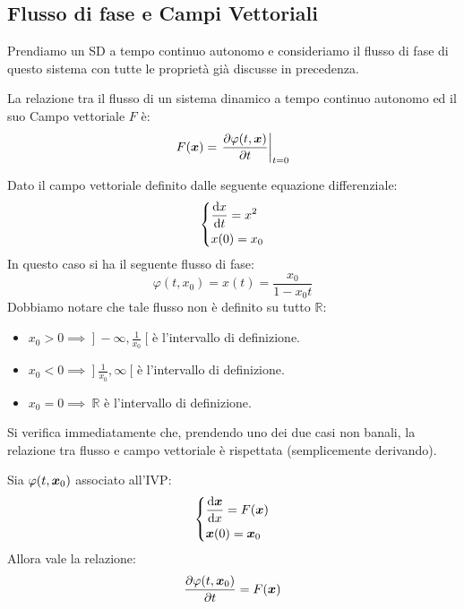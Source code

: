 \subsection{Flusso di fase e Campi Vettoriali}%
\label{sub:Flusso di fase e Campi Vettoriali}
Prendiamo un SD a tempo continuo autonomo e consideriamo il flusso di fase di questo sistema con tutte le proprietà già discusse in precedenza. \\
\begin{thm}
    La relazione tra il flusso di un sistema dinamico a tempo continuo autonomo ed il suo Campo vettoriale $F$ è:
    \[
	F(\boldsymbol{x})=\left.\frac{\partial \varphi (t, \boldsymbol{x})}{\partial t} \right|_{t=0}
    \] 
\end{thm}
\noindent
\begin{exmp}
    Dato il campo vettoriale definito dalle seguente equazione differenziale:
    \[\begin{dcases}
	\frac{\text{d} x}{\text{d} t} = x^2 \\
	x(0)=x_0
    \end{dcases}\] 
    In questo caso si ha il seguente flusso di fase:
    \[
	\varphi (t, x_0)= x(t)= \frac{x_0}{1-x_0t}
    \] 
    Dobbiamo notare che tale flusso non è definito su tutto $\mathbb{R}$:
    \begin{itemize}
	\item $x_0>0 \implies  \ ] \ -\infty, \frac{1}{x_0} \ [$ è l'intervallo di definizione.
	\item $x_0<0 \implies  \ ] \ \frac{1}{x_0}, \infty \ [$ è l'intervallo di definizione.
	\item $x_0=0 \implies\ \mathbb{R} $ è l'intervallo di definizione.
    \end{itemize}
    Si verifica immediatamente che, prendendo uno dei due casi non banali, la relazione tra flusso e campo vettoriale è rispettata (semplicemente derivando).
\end{exmp}
\noindent
\begin{thm}
    Sia $\varphi (t,\boldsymbol{x}_0)$ associato all'IVP:
     \[\begin{dcases}
	 \frac{\text{d} \boldsymbol{x}}{\text{d} x} = F(\boldsymbol{x})\\
	 \boldsymbol{x} (0)=\boldsymbol{x}_0
    \end{dcases}\] 
    Allora vale la relazione:
    \[
	\frac{\partial \varphi (t, \boldsymbol{x}_0)}{\partial t} = F(\boldsymbol{x})
    \] 
\end{thm}
